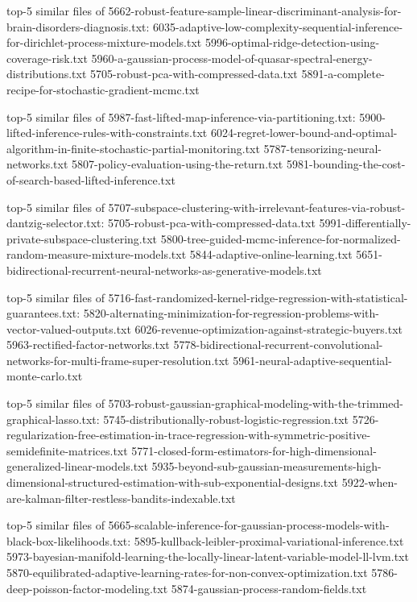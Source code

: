 \documentclass[11pt]{article}
\begin{document}
top-5 similar files of
5662-robust-feature-sample-linear-discriminant-analysis-for-brain-disorders-diagnosis.txt:
6035-adaptive-low-complexity-sequential-inference-for-dirichlet-process-mixture-models.txt
5996-optimal-ridge-detection-using-coverage-risk.txt
5960-a-gaussian-process-model-of-quasar-spectral-energy-distributions.txt
5705-robust-pca-with-compressed-data.txt
5891-a-complete-recipe-for-stochastic-gradient-mcmc.txt

top-5 similar files of
5987-fast-lifted-map-inference-via-partitioning.txt:
5900-lifted-inference-rules-with-constraints.txt
6024-regret-lower-bound-and-optimal-algorithm-in-finite-stochastic-partial-monitoring.txt
5787-tensorizing-neural-networks.txt
5807-policy-evaluation-using-the-return.txt
5981-bounding-the-cost-of-search-based-lifted-inference.txt

top-5 similar files of
5707-subspace-clustering-with-irrelevant-features-via-robust-dantzig-selector.txt:
5705-robust-pca-with-compressed-data.txt
5991-differentially-private-subspace-clustering.txt
5800-tree-guided-mcmc-inference-for-normalized-random-measure-mixture-models.txt
5844-adaptive-online-learning.txt
5651-bidirectional-recurrent-neural-networks-as-generative-models.txt

top-5 similar files of
5716-fast-randomized-kernel-ridge-regression-with-statistical-guarantees.txt:
5820-alternating-minimization-for-regression-problems-with-vector-valued-outputs.txt
6026-revenue-optimization-against-strategic-buyers.txt
5963-rectified-factor-networks.txt
5778-bidirectional-recurrent-convolutional-networks-for-multi-frame-super-resolution.txt
5961-neural-adaptive-sequential-monte-carlo.txt

top-5 similar files of
5703-robust-gaussian-graphical-modeling-with-the-trimmed-graphical-lasso.txt:
5745-distributionally-robust-logistic-regression.txt
5726-regularization-free-estimation-in-trace-regression-with-symmetric-positive-semidefinite-matrices.txt
5771-closed-form-estimators-for-high-dimensional-generalized-linear-models.txt
5935-beyond-sub-gaussian-measurements-high-dimensional-structured-estimation-with-sub-exponential-designs.txt
5922-when-are-kalman-filter-restless-bandits-indexable.txt

top-5 similar files of
5665-scalable-inference-for-gaussian-process-models-with-black-box-likelihoods.txt:
5895-kullback-leibler-proximal-variational-inference.txt
5973-bayesian-manifold-learning-the-locally-linear-latent-variable-model-ll-lvm.txt
5870-equilibrated-adaptive-learning-rates-for-non-convex-optimization.txt
5786-deep-poisson-factor-modeling.txt
5874-gaussian-process-random-fields.txt
\end{document}

